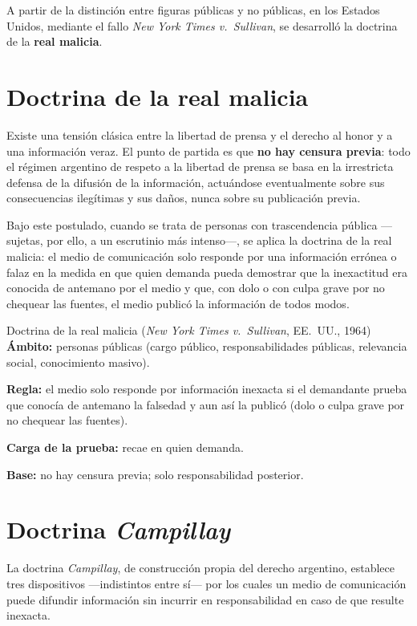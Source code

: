 \documentclass[12pt,oneside]{book}
\begin{document}
A partir de la distinción entre figuras públicas y no públicas, en los Estados Unidos, mediante el fallo \emph{New York Times v.\ Sullivan}, se desarrolló la doctrina de la \textbf{real malicia}.

\section{Doctrina de la real malicia}

Existe una tensión clásica entre la libertad de prensa y el derecho al honor y a una información veraz. El punto de partida es que \textbf{no hay censura previa}: todo el régimen argentino de respeto a la libertad de prensa se basa en la irrestricta defensa de la difusión de la información, actuándose eventualmente sobre sus consecuencias ilegítimas y sus daños, nunca sobre su publicación previa.

Bajo este postulado, cuando se trata de personas con trascendencia pública —sujetas, por ello, a un escrutinio más intenso—, se aplica la doctrina de la real malicia: el medio de comunicación solo responde por una información errónea o falaz en la medida en que quien demanda pueda demostrar que la inexactitud era conocida de antemano por el medio y que, con dolo o con culpa grave por no chequear las fuentes, el medio publicó la información de todos modos.

\begin{definition}{Doctrina de la real malicia (\emph{New York Times v.\ Sullivan}, EE.\ UU., 1964)}
\textbf{Ámbito:} personas públicas (cargo público, responsabilidades públicas, relevancia social, conocimiento masivo).

\textbf{Regla:} el medio solo responde por información inexacta si el demandante prueba que conocía de antemano la falsedad y aun así la publicó (dolo o culpa grave por no chequear las fuentes).

\textbf{Carga de la prueba:} recae en quien demanda.

\textbf{Base:} no hay censura previa; solo responsabilidad posterior.
\end{definition}

\section{Doctrina \emph{Campillay}}

La doctrina \emph{Campillay}, de construcción propia del derecho argentino, establece tres dispositivos —indistintos entre sí— por los cuales un medio de comunicación puede difundir información sin incurrir en responsabilidad en caso de que resulte inexacta.
\end{document}
